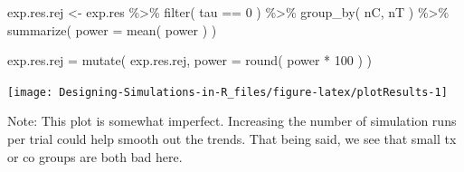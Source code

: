 \documentclass[
]{book}
\newenvironment{Shaded}{\begin{snugshade}}{\end{snugshade}}
\newcommand{\AttributeTok}[1]{\textcolor[rgb]{0.77,0.63,0.00}{#1}}
\newcommand{\DecValTok}[1]{\textcolor[rgb]{0.00,0.00,0.81}{#1}}
\newcommand{\FunctionTok}[1]{\textcolor[rgb]{0.00,0.00,0.00}{#1}}
\newcommand{\NormalTok}[1]{#1}
\newcommand{\OtherTok}[1]{\textcolor[rgb]{0.56,0.35,0.01}{#1}}
\newcommand{\SpecialCharTok}[1]{\textcolor[rgb]{0.00,0.00,0.00}{#1}}
\newcommand{\StringTok}[1]{\textcolor[rgb]{0.31,0.60,0.02}{#1}}
\begin{document}
\begin{Shaded}
\begin{Highlighting}[]
\NormalTok{exp.res.rej }\OtherTok{\textless{}{-}}\NormalTok{ exp.res }\SpecialCharTok{\%\textgreater{}\%} \FunctionTok{filter}\NormalTok{( tau }\SpecialCharTok{==} \DecValTok{0}\NormalTok{ ) }\SpecialCharTok{\%\textgreater{}\%}
  \FunctionTok{group\_by}\NormalTok{( nC, nT ) }\SpecialCharTok{\%\textgreater{}\%}
  \FunctionTok{summarize}\NormalTok{( }\AttributeTok{power =} \FunctionTok{mean}\NormalTok{( power ) )}

\NormalTok{exp.res.rej }\OtherTok{=} \FunctionTok{mutate}\NormalTok{( exp.res.rej, }\AttributeTok{power =} \FunctionTok{round}\NormalTok{( power }\SpecialCharTok{*} \DecValTok{100}\NormalTok{ ) )}
\end{Highlighting}
\end{Shaded}

\begin{Shaded}
\end{Shaded}

\begin{center}\texttt{[image: Designing-Simulations-in-R\_files/figure-latex/plotResults-1]} \end{center}

Note: This plot is somewhat imperfect. Increasing the number of simulation
runs per trial could help smooth out the trends. That being said, we see that
small tx or co groups are both bad here.
\end{document}
